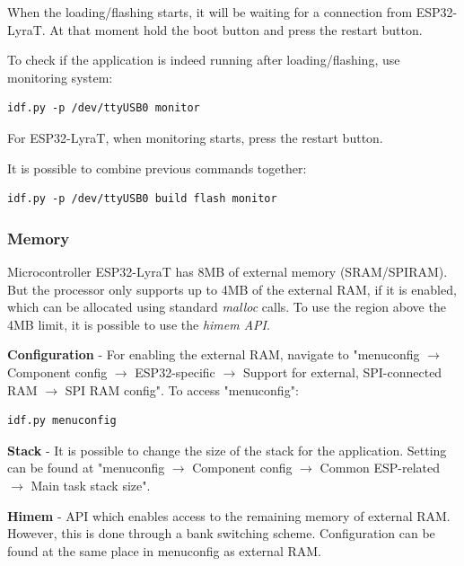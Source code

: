 \documentclass[thesis=M,english]{FITthesis}[2019/12/23]
\begin{document}
\bigskip
\noindent
When the loading/flashing starts, it will be waiting for a connection from ESP32-LyraT. At that moment hold the boot button and press the restart button.

\bigskip
\noindent
To check if the application is indeed running after loading/flashing, use monitoring system:
\begin{lstlisting}[frame=single]
idf.py -p /dev/ttyUSB0 monitor
\end{lstlisting}
For ESP32-LyraT, when monitoring starts, press the restart button.

\bigskip
\noindent
It is possible to combine previous commands together:
\begin{lstlisting}[frame=single]
idf.py -p /dev/ttyUSB0 build flash monitor
\end{lstlisting}

\subsubsection{Memory} \label{esp-memory}
Microcontroller ESP32-LyraT has 8MB of external memory (SRAM/SPIRAM). But the processor only supports up to 4MB of the external RAM, if it is enabled, which can be allocated using standard \textit{malloc} calls. To use the region above the 4MB limit, it is possible to use the \textit{himem API}.

\bigskip
\noindent
\textbf{Configuration} - For enabling the external RAM, navigate to "menuconfig $\rightarrow$ Component config $\rightarrow$ ESP32-specific $\rightarrow$ Support for external, SPI-connected RAM $\rightarrow$ SPI RAM config". To access "menuconfig":
\begin{lstlisting}[frame=single]
idf.py menuconfig
\end{lstlisting}

\bigskip
\noindent
\textbf{Stack} - It is possible to change the size of the stack for the application. Setting can be found at "menuconfig $\rightarrow$ Component config $\rightarrow$ Common ESP-related $\rightarrow$ Main task stack size".

\bigskip
\noindent
\textbf{Himem} - API which enables access to the remaining memory of external RAM. However, this is done through a bank switching scheme. Configuration can be found at the same place in menuconfig as external RAM.

\end{document}

